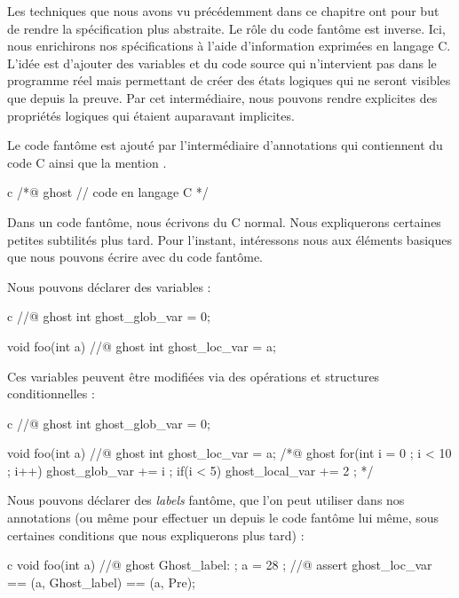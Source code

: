 Les techniques que nous avons vu précédemment dans ce chapitre ont pour but de
rendre la spécification plus abstraite. Le rôle du code fantôme est inverse. Ici,
nous enrichirons nos spécifications à l'aide d'information exprimées
en langage C. L'idée est d'ajouter des variables et du code source qui
n'intervient pas dans le programme réel mais permettant de créer des états
logiques qui ne seront visibles que depuis la preuve. Par cet intermédiaire,
nous pouvons rendre explicites des propriétés logiques qui étaient auparavant
implicites.




Le code fantôme est ajouté par l'intermédiaire d'annotations qui contiennent
du code C ainsi que la mention .



\begin{CodeBlock}{c}
/*@
  ghost
  // code en langage C
*/
\end{CodeBlock}


Dans un code fantôme, nous écrivons du C normal. Nous expliquerons certaines
petites subtilités plus tard. Pour l'instant, intéressons nous aux éléments
basiques que nous pouvons écrire avec du code fantôme.


Nous pouvons déclarer des variables :


\begin{CodeBlock}{c}
//@ ghost int ghost_glob_var = 0;

void foo(int a){
  //@ ghost int ghost_loc_var = a;
}
\end{CodeBlock}


Ces variables peuvent être modifiées via des opérations et structures
conditionnelles :


\begin{CodeBlock}{c}
//@ ghost int ghost_glob_var = 0;

void foo(int a){
  //@ ghost int ghost_loc_var = a;
  /*@ ghost
    for(int i = 0 ; i < 10 ; i++){
      ghost_glob_var += i ;
      if(i < 5) ghost_local_var += 2 ;
    }
  */
}
\end{CodeBlock}


Nous pouvons déclarer des \textit{labels} fantôme, que l'on peut utiliser dans
nos annotations (ou même pour effectuer un  depuis le code
fantôme lui même, sous certaines conditions que nous expliquerons plus tard) :


\begin{CodeBlock}{c}
void foo(int a){
  //@ ghost Ghost_label: ;
  a = 28 ;
  //@ assert ghost_loc_var == \at(a, Ghost_label) == \at(a, Pre);
}
\end{CodeBlock}



